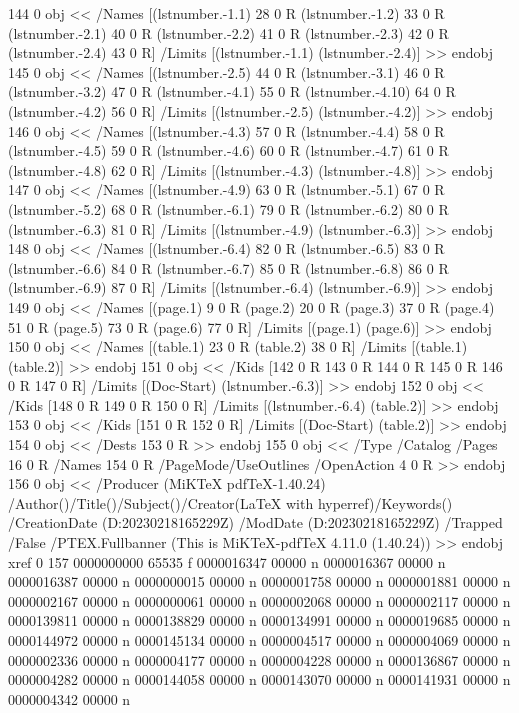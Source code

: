 {{{{{144 0 obj
<<
/Names [(lstnumber.-1.1) 28 0 R (lstnumber.-1.2) 33 0 R (lstnumber.-2.1) 40 0 R (lstnumber.-2.2) 41 0 R (lstnumber.-2.3) 42 0 R (lstnumber.-2.4) 43 0 R]
/Limits [(lstnumber.-1.1) (lstnumber.-2.4)]
>>
endobj
145 0 obj
<<
/Names [(lstnumber.-2.5) 44 0 R (lstnumber.-3.1) 46 0 R (lstnumber.-3.2) 47 0 R (lstnumber.-4.1) 55 0 R (lstnumber.-4.10) 64 0 R (lstnumber.-4.2) 56 0 R]
/Limits [(lstnumber.-2.5) (lstnumber.-4.2)]
>>
endobj
146 0 obj
<<
/Names [(lstnumber.-4.3) 57 0 R (lstnumber.-4.4) 58 0 R (lstnumber.-4.5) 59 0 R (lstnumber.-4.6) 60 0 R (lstnumber.-4.7) 61 0 R (lstnumber.-4.8) 62 0 R]
/Limits [(lstnumber.-4.3) (lstnumber.-4.8)]
>>
endobj
147 0 obj
<<
/Names [(lstnumber.-4.9) 63 0 R (lstnumber.-5.1) 67 0 R (lstnumber.-5.2) 68 0 R (lstnumber.-6.1) 79 0 R (lstnumber.-6.2) 80 0 R (lstnumber.-6.3) 81 0 R]
/Limits [(lstnumber.-4.9) (lstnumber.-6.3)]
>>
endobj
148 0 obj
<<
/Names [(lstnumber.-6.4) 82 0 R (lstnumber.-6.5) 83 0 R (lstnumber.-6.6) 84 0 R (lstnumber.-6.7) 85 0 R (lstnumber.-6.8) 86 0 R (lstnumber.-6.9) 87 0 R]
/Limits [(lstnumber.-6.4) (lstnumber.-6.9)]
>>
endobj
149 0 obj
<<
/Names [(page.1) 9 0 R (page.2) 20 0 R (page.3) 37 0 R (page.4) 51 0 R (page.5) 73 0 R (page.6) 77 0 R]
/Limits [(page.1) (page.6)]
>>
endobj
150 0 obj
<<
/Names [(table.1) 23 0 R (table.2) 38 0 R]
/Limits [(table.1) (table.2)]
>>
endobj
151 0 obj
<<
/Kids [142 0 R 143 0 R 144 0 R 145 0 R 146 0 R 147 0 R]
/Limits [(Doc-Start) (lstnumber.-6.3)]
>>
endobj
152 0 obj
<<
/Kids [148 0 R 149 0 R 150 0 R]
/Limits [(lstnumber.-6.4) (table.2)]
>>
endobj
153 0 obj
<<
/Kids [151 0 R 152 0 R]
/Limits [(Doc-Start) (table.2)]
>>
endobj
154 0 obj
<<
/Dests 153 0 R
>>
endobj
155 0 obj
<<
/Type /Catalog
/Pages 16 0 R
/Names 154 0 R
/PageMode/UseOutlines
/OpenAction 4 0 R
>>
endobj
156 0 obj
<<
/Producer (MiKTeX pdfTeX-1.40.24)
/Author()/Title()/Subject()/Creator(LaTeX with hyperref)/Keywords()
/CreationDate (D:20230218165229Z)
/ModDate (D:20230218165229Z)
/Trapped /False
/PTEX.Fullbanner (This is MiKTeX-pdfTeX 4.11.0 (1.40.24))
>>
endobj
xref
0 157
0000000000 65535 f 
0000016347 00000 n 
0000016367 00000 n 
0000016387 00000 n 
0000000015 00000 n 
0000001758 00000 n 
0000001881 00000 n 
0000002167 00000 n 
0000000061 00000 n 
0000002068 00000 n 
0000002117 00000 n 
0000139811 00000 n 
0000138829 00000 n 
0000134991 00000 n 
0000019685 00000 n 
0000144972 00000 n 
0000145134 00000 n 
0000004517 00000 n 
0000004069 00000 n 
0000002336 00000 n 
0000004177 00000 n 
0000004228 00000 n 
0000136867 00000 n 
0000004282 00000 n 
0000144058 00000 n 
0000143070 00000 n 
0000141931 00000 n 
0000004342 00000 n 
}}}}}
